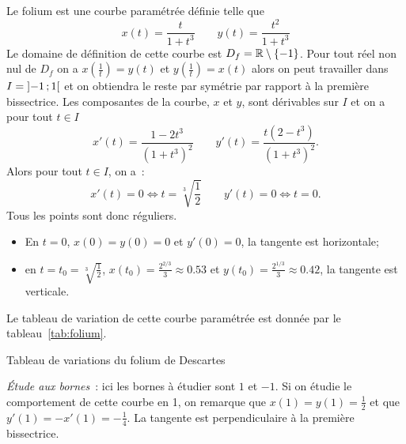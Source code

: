 Le folium est une courbe paramétrée définie telle que
\begin{equation}
  x(t) = \frac{t}{1 + t^3} \qquad y(t)=\frac{t^2}{1 + t^3}
\end{equation}
Le domaine de définition de cette courbe est \(D_f = \mathbb{R}\setminus\{-1\}\). Pour
tout réel non nul de \(D_f\) on a \(x\left(\frac{1}{t}\right)=y(t)\) et
\(y\left(\frac{1}{t}\right)=x(t)\) alors on peut travailler dans \(I =
\left] -1 \, ; {} 1 \right[\) et on obtiendra le reste par symétrie par rapport à la
première bissectrice. Les composantes de la courbe, \(x\) et \(y\), sont
dérivables sur \(I\) et on a pour tout \(t \in I\)
\begin{equation}
  x'(t)=\dfrac{1-2t^3}{(1 + t^3)^2} \qquad y'(t)=\dfrac{t(2-t^3)}{(1 + t^3)^2}.
\end{equation}
Alors pour tout \(t \in I\), on a~:
\begin{equation}
  x'(t)=0 \iff t = \sqrt[3]{\frac{1}{2}} \qquad y'(t)=0 \iff t = 0.
\end{equation}
Tous les points sont donc réguliers.
\begin{itemize}
  \item En \(t = 0\), \(x(0)=y(0)=0\) et \(y'(0)=0\), la tangente est
    horizontale;
  \item en \(t = t_0 = \sqrt[3]{\frac{1}{2}}\),  \(x(t_0)=\frac{2^{2/3}}{3}
    \approx 0.53\) et \(y(t_0)=\frac{2^{1/3}}{3}\approx 0.42\), la tangente est
    verticale.
\end{itemize}

Le tableau de variation de cette courbe paramétrée est donnée par le
tableau~\ref{tab:folium}.

\begin{table}
  \centering   {}
  \caption{Tableau de variations du folium de Descartes}
  \label{tab:folium}
\end{table}

\emph{Étude aux bornes}~:
ici les bornes à étudier sont \(1\) et \(-1\). Si on étudie le comportement de
cette courbe en 1, on remarque que \(x(1)=y(1)=\frac{1}{2}\) et que
\(y'(1)=-x'(1)=-\frac{1}{4}\). La tangente est perpendiculaire à la première
bissectrice.

